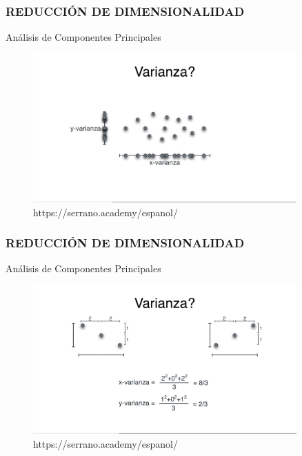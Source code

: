 \documentclass{beamer}
\begin{document}
\begin{frame}
	\frametitle{REDUCCIÓN DE DIMENSIONALIDAD}
	\begin{block}{Análisis de Componentes Principales}	
		\begin{figure}
			\includegraphics[width=0.9\textwidth]{PCA/IMG_3550.jpg}
			\caption{https://serrano.academy/espanol/}
		\end{figure}
	\end{block}
\end{frame}

\begin{frame}
	\frametitle{REDUCCIÓN DE DIMENSIONALIDAD}
	\begin{block}{Análisis de Componentes Principales}	
		\begin{figure}
			\includegraphics[width=0.9\textwidth]{PCA/IMG_3551.jpg}
			\caption{https://serrano.academy/espanol/}
		\end{figure}
	\end{block}
\end{frame}
\end{document}
